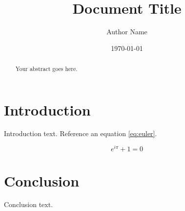 \documentclass[a4paper,12pt]{article}
\title{Document Title}
\author{Author Name}
\date{\today}
\begin{document}
\maketitle

\begin{abstract}
Your abstract goes here.
\end{abstract}

\section{Introduction}
Introduction text. Reference an equation \cref{eq:euler}.

\begin{equation} \label{eq:euler}
    e^{i\pi} + 1 = 0
\end{equation}

\section{Conclusion}
Conclusion text.

\printbibliography
\end{document}
